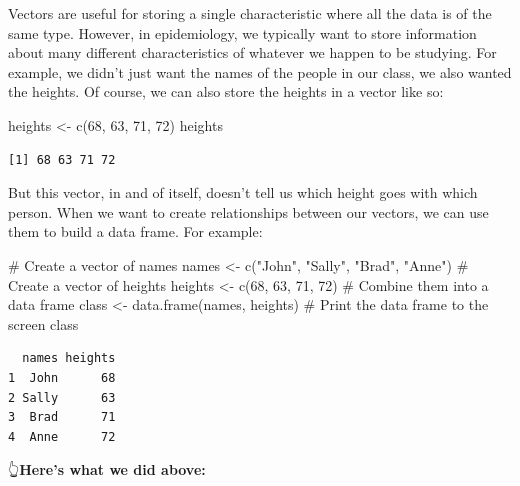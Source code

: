 \documentclass[
  letterpaper,
  DIV=11,
  numbers=noendperiod]{scrreprt}
\newenvironment{Shaded}{\begin{snugshade}}{\end{snugshade}}
\newcommand{\CommentTok}[1]{\textcolor[rgb]{0.37,0.37,0.37}{#1}}
\newcommand{\DecValTok}[1]{\textcolor[rgb]{0.68,0.00,0.00}{#1}}
\newcommand{\FunctionTok}[1]{\textcolor[rgb]{0.28,0.35,0.67}{#1}}
\newcommand{\NormalTok}[1]{\textcolor[rgb]{0.00,0.23,0.31}{#1}}
\newcommand{\OtherTok}[1]{\textcolor[rgb]{0.00,0.23,0.31}{#1}}
\newcommand{\StringTok}[1]{\textcolor[rgb]{0.13,0.47,0.30}{#1}}
\begin{document}
Vectors are useful for storing a single characteristic where all the
data is of the same type. However, in epidemiology, we typically want to
store information about many different characteristics of whatever we
happen to be studying. For example, we didn't just want the names of the
people in our class, we also wanted the heights. Of course, we can also
store the heights in a vector like so:

\begin{Shaded}
\begin{Highlighting}[]
\NormalTok{heights }\OtherTok{\textless{}{-}} \FunctionTok{c}\NormalTok{(}\DecValTok{68}\NormalTok{, }\DecValTok{63}\NormalTok{, }\DecValTok{71}\NormalTok{, }\DecValTok{72}\NormalTok{)}
\NormalTok{heights}
\end{Highlighting}
\end{Shaded}

\begin{verbatim}
[1] 68 63 71 72
\end{verbatim}

But this vector, in and of itself, doesn't tell us which height goes
with which person. When we want to create relationships between our
vectors, we can use them to build a data frame. For example:

\begin{Shaded}
\begin{Highlighting}[]
\CommentTok{\# Create a vector of names}
\NormalTok{names }\OtherTok{\textless{}{-}} \FunctionTok{c}\NormalTok{(}\StringTok{"John"}\NormalTok{, }\StringTok{"Sally"}\NormalTok{, }\StringTok{"Brad"}\NormalTok{, }\StringTok{"Anne"}\NormalTok{)}
\CommentTok{\# Create a vector of heights}
\NormalTok{heights }\OtherTok{\textless{}{-}} \FunctionTok{c}\NormalTok{(}\DecValTok{68}\NormalTok{, }\DecValTok{63}\NormalTok{, }\DecValTok{71}\NormalTok{, }\DecValTok{72}\NormalTok{)}
\CommentTok{\# Combine them into a data frame}
\NormalTok{class }\OtherTok{\textless{}{-}} \FunctionTok{data.frame}\NormalTok{(names, heights)}
\CommentTok{\# Print the data frame to the screen}
\NormalTok{class}
\end{Highlighting}
\end{Shaded}

\begin{verbatim}
  names heights
1  John      68
2 Sally      63
3  Brad      71
4  Anne      72
\end{verbatim}

👆\textbf{Here's what we did above:}
\end{document}
